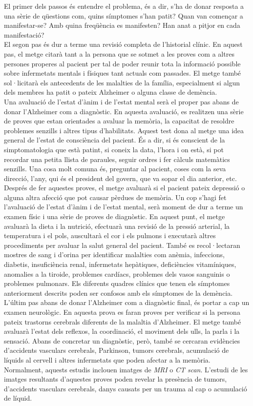 \documentclass[a4paper,12pt]{report}
\begin{document}
El primer dels passos és entendre el problema, és a dir, s'ha de donar resposta a una sèrie de qüestions com, quins símptomes s'han patit? Quan van començar a manifestar-se? Amb quina freqüència es manifesten? Han anat a pitjor en cada manifestació?\\
El segon pas és dur a terme una revisió completa de l'historial clínic. En aquest pas, el metge citarà tant a la persona que se sotmet a les proves com a altres persones properes al pacient per tal de poder reunir tota la informació possible sobre infermetats mentals i físiques tant actuals com passades. El metge també sol·licitarà els antecedents de les malalties de la família, especialment si algun dels membres ha patit o pateix Alzheimer o alguna classe de demència.\\
Una avaluació de l'estat d'ànim i de l'estat mental serà el proper pas abans de donar l'Alzheimer com a diagnòstic. En aquesta avaluació, es realitzen una sèrie de proves que estan orientades a avaluar la memòria, la capacitat de resoldre problemes senzills i altres tipus d'habilitats. Aquest test dona al metge una idea general de l'estat de consciència del pacient. És a dir, si és conscient de la simptomatologia que està patint, si coneix la data, l'hora i on està, si pot recordar una petita llista de paraules, seguir ordres i fer càlculs matemàtics senzills. Una cosa molt comuna és, preguntar al pacient, coses com la seva direcció, l'any, qui és el president del govern, que va sopar el dia anterior, etc. Després de fer aquestes proves, el metge avaluarà si el pacient pateix depressió o alguna altra afecció que pot causar pèrdues de memòria. Un cop s'hagi fet l'avaluació de l'estat d'ànim i de l'estat mental, serà moment de dur a terme un examen físic i una sèrie de proves de diagnòstic. En aquest punt, el metge avaluarà la dieta i la nutrició, efectuarà una revisió de la pressió arterial, la temperatura i el pols, auscultarà el cor i els pulmons i executarà altres procediments per avaluar la salut general del pacient. També es recol·lectaran mostres de sang i d'orina per identificar malalties com anèmia, infeccions, diabetis, insuficiència renal, infermetats hepàtiques, deficiències vitamíniques, anomalies a la tiroide, problemes cardíacs, problemes dels vasos sanguinis o problemes pulmonars. Els diferents quadres clínics que tenen els símptomes anteriorment descrits poden ser confosos amb els símptomes de la demència.\\
L'últim pas abans de donar l'Alzheimer com a diagnòstic final, és portar a cap un examen neurològic. En aquesta prova es faran proves per verificar si la persona pateix trastorns cerebrals diferents de la malaltia d'Alzheimer. El metge també avaluarà l'estat dels reflexos, la coordinació, el moviment dels ulls, la parla i la sensació. Abans de concretar un diagnòstic, però, també se cercaran evidències d'accidents vasculars cerebrals, Parkinson, tumors cerebrals, acumulació de líquids al cervell i altres infermetats que poden afectar a la memòria. Normalment, aquests estudis inclouen imatges de \textit{MRI} o \textit{CT scan}. L'estudi de les imatges resultants d'aquestes proves poden revelar la presència de tumors, d'accidents vasculars cerebrals, danys causats per un trauma al cap o acumulació de líquid.
\end{document}
